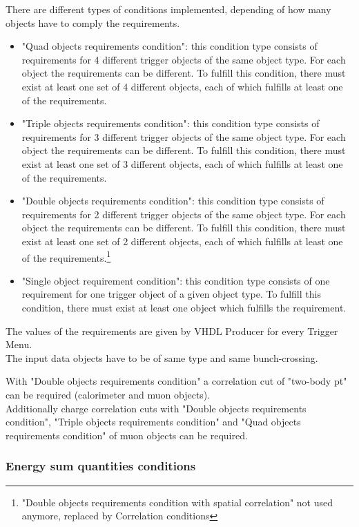 There are different types of conditions implemented, depending of how many objects have to comply the requirements.
\begin{itemize}
\item "Quad objects requirements condition": this condition type consists of requirements for 4 different trigger objects of the same object type.
For each object the requirements can be different. To fulfill this condition, there must exist at least one set of 4 different objects,
each of which fulfills at least one of the requirements.
\item "Triple objects requirements condition": this condition type consists of requirements for 3 different trigger objects of the same object type.
For each object the requirements can be different. To fulfill this condition, there must exist at least one set of 3 different objects,
each of which fulfills at least one of the requirements.
\item "Double objects requirements condition": this condition type consists of requirements for 2 different trigger objects of the same object type.
For each object the requirements can be different. To fulfill this condition, there must exist at least one set of 2 different objects,
each of which fulfills at least one of the requirements.\footnote{"Double objects requirements condition with spatial correlation" not used anymore, replaced by Correlation conditions}
\item "Single object requirement condition": this condition type consists of one requirement for one trigger object of a given object type.
To fulfill this condition, there must exist at least one object which fulfills the requirement.
\end{itemize}

The values of the requirements are given by VHDL Producer for every Trigger Menu.\\
The input data objects have to be of same type and same bunch-crossing.

With "Double objects requirements condition" a correlation cut of "two-body pt" can be required (calorimeter and muon objects).\\
Additionally charge correlation cuts with "Double objects requirements condition", "Triple objects requirements condition" and "Quad objects requirements condition" of muon objects can be required.

\clearpage

\subsubsection{Energy sum quantities conditions}
\label{sec:gtl:esums_conditions}

